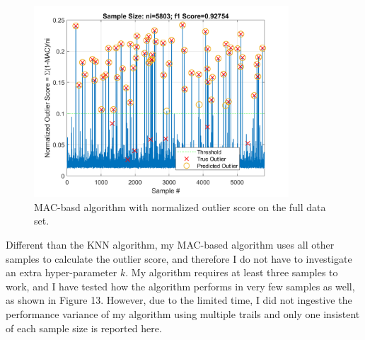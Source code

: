\documentclass[12pt]{article}
\begin{document}
\begin{figure}[ht!]
\centering
\includegraphics[width=0.85\textwidth]{f1score_ni5803}
\caption{MAC-basd algorithm with normalized outlier score on the full data set.}
\label{fig:fig12}
\end{figure}

Different than the KNN algorithm, my MAC-based algorithm uses all other samples 
to calculate the outlier score, and therefore I do not have to investigate an extra
hyper-parameter $k$. My algorithm requires at least three samples to work, and I have tested how
the algorithm performs in very few samples as well, as shown in Figure 13. 
However, due to the limited time, I did not ingestive the performance variance of my algorithm using 
multiple trails and only one insistent of each sample size is reported here.
\end{document}
